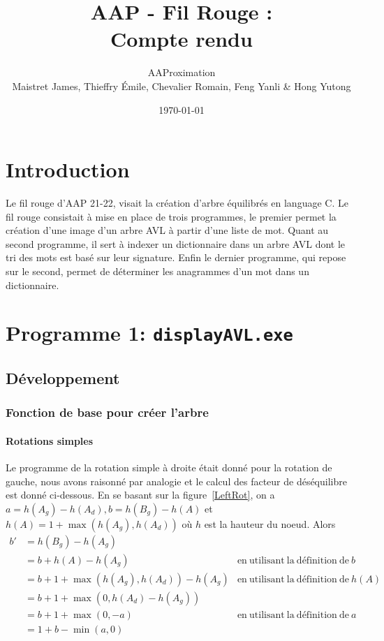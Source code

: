 \documentclass{article} %
\title{AAP - Fil Rouge :\\ Compte rendu}
\author{AAProximation \\ Maistret James, Thieffry \'Emile, Chevalier Romain, Feng Yanli \&  Hong Yutong}
\date{\today}
\begin{document}
\maketitle
\setcounter{secnumdepth}{3}
\setcounter{tocdepth}{3}

\tableofcontents
\listoffigures

\newpage

\section{Introduction}

Le fil rouge d'AAP 21-22, visait la création d'arbre équilibrés en language C. Le fil rouge consistait à mise en place de trois programmes, le premier permet la création d'une image d'un arbre AVL à partir d'une liste de mot. Quant au second programme, il sert à indexer un dictionnaire dans un arbre AVL dont le tri des mots est basé sur leur signature. Enfin le dernier programme, qui repose sur le second, permet de déterminer les anagrammes d'un mot dans un dictionnaire. 

\section{Programme 1: \texttt{displayAVL.exe}}
\label{sec:prog_1}
\subsection{Développement}
\subsubsection{Fonction de base pour créer l'arbre}
\paragraph{Rotations simples} Le programme de la rotation simple à droite était donné pour la rotation de gauche, nous avons raisonné par analogie et le calcul des facteur de déséquilibre est donné ci-dessous. En se basant sur la figure~\ref{LeftRot}, on a \( a = h(A_g) - h(A_d), b = h(B_g) - h(A)\) et \(h(A) = 1 +\max (h(A_g), h(A_d)) \) où \(h\) est la hauteur du noeud. Alors 
\begin{align*}
b' &= h(B_g)-h(A_g) \\
&= b + h(A) - h(A_g) & \mathrm{en\  utilisant \ la \  définition \  de } \ b  \\
&= b +  1 +\max (h(A_g), h(A_d)) - h(A_g) & \mathrm{en \ utilisant \ la \ définition\ de} \ h(A)  \\
&= b + 1 + \max(0, h(A_d)-h(A_g))\\
&= b + 1 + \max(0, -a) & \mathrm{en\  utilisant \ la \  définition \  de } \ a \\
&= 1+ b -\min(a,0)
\end{align*} %
\end{document}
